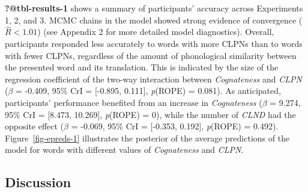 \documentclass[
]{article}
\begin{document}
\textbf{?@tbl-results-1} shows a summary of participants' accuracy
across Experiments 1, 2, and 3. MCMC chains in the model showed strong
evidence of convergence (\(\hat{R}<1.01\)) (see Appendix 2 for more
detailed model diagnostics). Overall, participants responded less
accurately to words with more CLPNs than to words with fewer CLPNs,
regardless of the amount of phonological similarity between the
presented word and its translation. This is indicated by the size of the
regression coefficient of the two-way interaction between
\emph{Cognateness} and \emph{CLPN} (\(\beta\) = -0.409, 95\% CrI =
{[}-0.895, 0.111{]}, \emph{p}(ROPE) = 0.081). As anticipated,
participants' performance benefited from an increase in
\emph{Cognateness} (\(\beta\) = 9.274, 95\% CrI = {[}8.473, 10.269{]},
\emph{p}(ROPE) = 0), while the number of \emph{CLND} had the opposite
effect (\(\beta\) = -0.069, 95\% CrI = {[}-0.353, 0.192{]},
\emph{p}(ROPE) = 0.492). Figure~\ref{fig-epreds-1} illustrates the
posterior of the average predictions of the model for words with
different values of \emph{Cognateness} and \emph{CLPN}.

\begin{figure}


\caption{\label{fig-epreds-2}}

\end{figure}%

\subsection{Discussion}\label{discussion-1}
\end{document}
